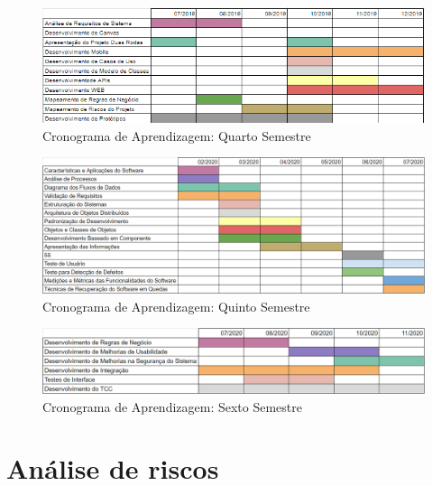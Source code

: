 \begin{figure}[H]
\caption{\label{cron-4-semestre}Cronograma de Aprendizagem: Quarto Semestre}
\begin{center}
	\includegraphics[scale=0.90]{./Figuras/cronograma-4-semestre.png}
\end{center}
\end{figure}


\begin{figure}[H]
\caption{\label{cron-5-semestre}Cronograma de Aprendizagem: Quinto Semestre}
\begin{center}
	\includegraphics[scale=0.47]{./Figuras/cronograma-5-semestre.png}
\end{center}
\end{figure}

\begin{figure}[H]
	\caption{\label{cron-6-semestre}Cronograma de Aprendizagem: Sexto Semestre}
	\begin{center}
		\includegraphics[scale=0.52]{./Figuras/cronograma-6-semestre.png}
	\end{center}
\end{figure}

\section{Análise de riscos}

